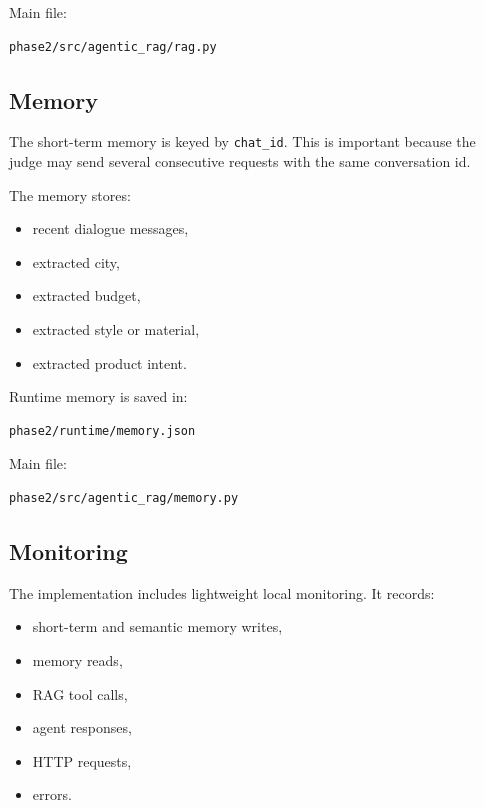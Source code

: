 \documentclass[12pt,a4paper]{article}
\begin{document}
Main file:

\begin{lstlisting}
phase2/src/agentic_rag/rag.py
\end{lstlisting}

\subsection{Memory}

The short-term memory is keyed by \texttt{chat\_id}. This is important because the judge may send several consecutive requests with the same conversation id.

The memory stores:

\begin{itemize}[noitemsep]
  \item recent dialogue messages,
  \item extracted city,
  \item extracted budget,
  \item extracted style or material,
  \item extracted product intent.
\end{itemize}

Runtime memory is saved in:

\begin{lstlisting}
phase2/runtime/memory.json
\end{lstlisting}

Main file:

\begin{lstlisting}
phase2/src/agentic_rag/memory.py
\end{lstlisting}

\subsection{Monitoring}

The implementation includes lightweight local monitoring. It records:

\begin{itemize}[noitemsep]
  \item short-term and semantic memory writes,
  \item memory reads,
  \item RAG tool calls,
  \item agent responses,
  \item HTTP requests,
  \item errors.
\end{itemize}
\end{document}
